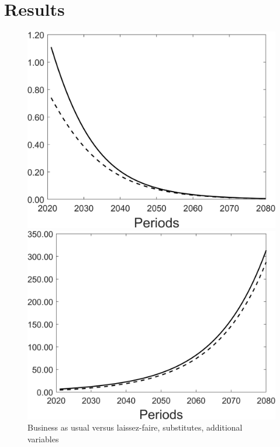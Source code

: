 \section{Results}
\begin{figure}[h!!]
	\centering
	\caption{Business as usual versus laissez-faire, substitutes, additional variables }\label{fig:onlyBAU_add}
	
	\begin{minipage}[]{0.32\textwidth}
		\includegraphics[width=1\textwidth]{../../codding_model/Own/figures/Rep_agent/staticBAU_LF_separate_yc_periods59_eppsilon4.00_zeta1.40_Ad08_Ac04_thetac0.70_thetad0.56_HetGrowth1_tauul0.181_util0_withtarget0_lgd0.png}
	\end{minipage}
	\begin{minipage}[]{0.32\textwidth}
		\includegraphics[width=1\textwidth]{../../codding_model/Own/figures/Rep_agent/staticBAU_LF_separate_yd_periods59_eppsilon4.00_zeta1.40_Ad08_Ac04_thetac0.70_thetad0.56_HetGrowth1_tauul0.181_util0_withtarget0_lgd0.png}

\end{minipage}
\end{figure}
